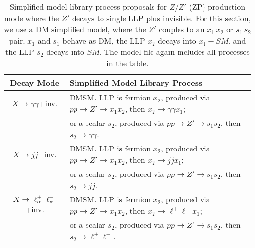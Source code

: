 \begin{table}
\begin{center}
\begin{tabular}{ |c|l|} 
 \hline
Decay Mode & Simplified Model Library Process \\
\hline\hline
$X\rightarrow \gamma\gamma$+inv. & DMSM. LLP is fermion $x_2$, produced via $p p \rightarrow Z' \rightarrow x_1 x_2$, then $ x_2 \rightarrow \gamma \gamma x_1$;\\
& or a scalar $s_2$, produced via $p p \rightarrow Z' \rightarrow s_1 s_2$, then $s_2 \rightarrow \gamma \gamma$. \\
\hline
$X\rightarrow jj$+inv.& DMSM. LLP is fermion $x_2$, produced via $p p \rightarrow Z' \rightarrow x_1 x_2$, then $ x_2 \rightarrow j j x_1$;\\
&or a scalar $s_2$, produced via $p p \rightarrow Z' \rightarrow s_1 s_2$, then $s_2 \rightarrow j j$. \\
\hline
$X\rightarrow \ell_\alpha^+\ell_\alpha^-$+inv. & DMSM. LLP is fermion $x_2$, produced via $p p \rightarrow Z' \rightarrow x_1 x_2$, then $ x_2 \rightarrow \ell^+ \ell^- x_1$;\\
&or a scalar $s_2$, produced via $p p \rightarrow Z' \rightarrow s_1 s_2$, then $s_2 \rightarrow \ell^+ \ell^-$. \\

\hline
\end{tabular}
\end{center}
\caption{Simplified model library process proposals for $Z/Z'$ (ZP) production mode where the $Z'$ decays to single LLP plus invisible. For this section, we use a DM simplified model, where the $Z'$ couples to an $x_1\, x_2$ or $s_1\, s_2$ pair. $x_1$ and $s_1$ behave as DM, the LLP $x_2$ decays into $x_1+SM$, and the LLP $s_2$ decays into $SM$. The model file again includes all processes in the table.}\label{tab:Zp_single_neutral_library}
\end{table}

